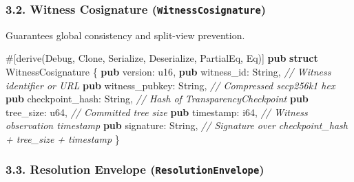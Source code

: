 \documentclass[
]{article}
\newenvironment{Shaded}{}{}
\newcommand{\AttributeTok}[1]{\textcolor[rgb]{0.49,0.56,0.16}{#1}}
\newcommand{\BuiltInTok}[1]{\textcolor[rgb]{0.00,0.50,0.00}{#1}}
\newcommand{\CommentTok}[1]{\textcolor[rgb]{0.38,0.63,0.69}{\textit{#1}}}
\newcommand{\DataTypeTok}[1]{\textcolor[rgb]{0.56,0.13,0.00}{#1}}
\newcommand{\KeywordTok}[1]{\textcolor[rgb]{0.00,0.44,0.13}{\textbf{#1}}}
\newcommand{\NormalTok}[1]{#1}
\newcommand{\OperatorTok}[1]{\textcolor[rgb]{0.40,0.40,0.40}{#1}}
\begin{document}
\hypertarget{witness-cosignature-witnesscosignature}{%
\subsubsection{\texorpdfstring{3.2. Witness Cosignature
(\texttt{WitnessCosignature})}{3.2. Witness Cosignature (WitnessCosignature)}}\label{witness-cosignature-witnesscosignature}}

Guarantees global consistency and split-view prevention.

\begin{Shaded}
\begin{Highlighting}[]
\AttributeTok{\#[}\NormalTok{derive}\AttributeTok{(}\BuiltInTok{Debug}\OperatorTok{,} \BuiltInTok{Clone}\OperatorTok{,}\NormalTok{ Serialize}\OperatorTok{,}\NormalTok{ Deserialize}\OperatorTok{,} \BuiltInTok{PartialEq}\OperatorTok{,} \BuiltInTok{Eq}\AttributeTok{)]}
\KeywordTok{pub} \KeywordTok{struct}\NormalTok{ WitnessCosignature }\OperatorTok{\{}
    \KeywordTok{pub}\NormalTok{ version}\OperatorTok{:} \DataTypeTok{u16}\OperatorTok{,}
    \KeywordTok{pub}\NormalTok{ witness\_id}\OperatorTok{:} \DataTypeTok{String}\OperatorTok{,}              \CommentTok{// Witness identifier or URL}
    \KeywordTok{pub}\NormalTok{ witness\_pubkey}\OperatorTok{:} \DataTypeTok{String}\OperatorTok{,}          \CommentTok{// Compressed secp256k1 hex}
    \KeywordTok{pub}\NormalTok{ checkpoint\_hash}\OperatorTok{:} \DataTypeTok{String}\OperatorTok{,}         \CommentTok{// Hash of TransparencyCheckpoint}
    \KeywordTok{pub}\NormalTok{ tree\_size}\OperatorTok{:} \DataTypeTok{u64}\OperatorTok{,}                  \CommentTok{// Committed tree size}
    \KeywordTok{pub}\NormalTok{ timestamp}\OperatorTok{:} \DataTypeTok{i64}\OperatorTok{,}                  \CommentTok{// Witness observation timestamp}
    \KeywordTok{pub}\NormalTok{ signature}\OperatorTok{:} \DataTypeTok{String}\OperatorTok{,}               \CommentTok{// Signature over checkpoint\_hash + tree\_size + timestamp}
\OperatorTok{\}}
\end{Highlighting}
\end{Shaded}

\hypertarget{resolution-envelope-resolutionenvelope}{%
\subsubsection{\texorpdfstring{3.3. Resolution Envelope
(\texttt{ResolutionEnvelope})}{3.3. Resolution Envelope (ResolutionEnvelope)}}\label{resolution-envelope-resolutionenvelope}}
\end{document}

